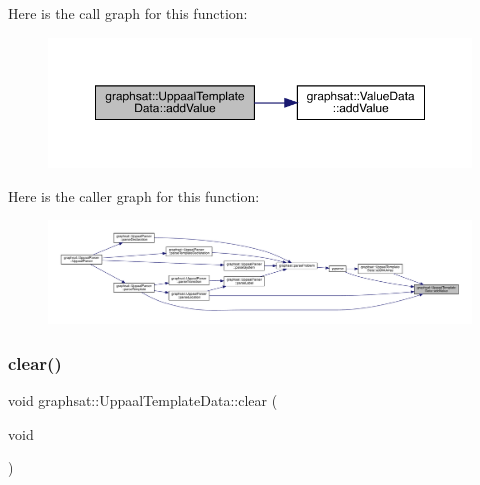 Here is the call graph for this function\+:
\nopagebreak
\begin{figure}[H]
\begin{center}
\leavevmode
\includegraphics[width=350pt]{classgraphsat_1_1_uppaal_template_data_aa79e5565c392d285cba2bf2e3b874f77_cgraph}
\end{center}
\end{figure}
Here is the caller graph for this function\+:
\nopagebreak
\begin{figure}[H]
\begin{center}
\leavevmode
\includegraphics[width=350pt]{classgraphsat_1_1_uppaal_template_data_aa79e5565c392d285cba2bf2e3b874f77_icgraph}
\end{center}
\end{figure}
\mbox{\label{classgraphsat_1_1_uppaal_template_data_a2613193aee357282a262ea27fb672ed7}} 
\subsubsection{\texorpdfstring{clear()}{clear()}}
{\footnotesize\ttfamily void graphsat\+::\+Uppaal\+Template\+Data\+::clear (\begin{DoxyParamCaption}\item[{void}]{ }\end{DoxyParamCaption})\hspace{0.3cm}{\ttfamily [inline]}}

